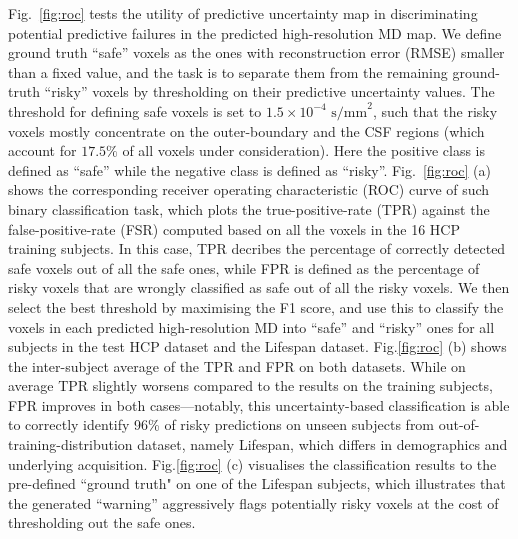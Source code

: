 Fig.~\ref{fig:roc} tests the utility of predictive uncertainty map in discriminating potential predictive failures in the predicted high-resolution MD map. We define ground truth ``safe'' voxels as the ones with reconstruction error (RMSE) smaller than a fixed value, and the task is to separate them from the remaining ground-truth ``risky'' voxels  by thresholding on their predictive uncertainty values. The threshold for defining safe voxels is set to $1.5\times10^{-4} \text{ s/mm}^2$, such that the risky voxels mostly concentrate on the outer-boundary and the CSF regions (which account for $17.5\%$ of all voxels under consideration). Here the positive class is defined as ``safe'' while  the negative class is defined as ``risky''. Fig.~\ref{fig:roc} (a) shows the corresponding receiver operating characteristic (ROC) curve of such binary classification task, which plots the true-positive-rate (TPR) against the false-positive-rate (FSR) computed based on all the voxels in the 16 HCP training subjects. In this case, TPR decribes the percentage of correctly detected safe voxels out of all the safe ones, while FPR is defined as the percentage of risky voxels that are wrongly classified as safe out of all the risky voxels. We then select the best threshold by maximising the F1 score, and use this to classify the voxels in each predicted high-resolution MD into ``safe'' and ``risky'' ones for all subjects in the test HCP dataset and the Lifespan dataset. Fig.\ref{fig:roc} (b) shows the inter-subject average of the TPR and FPR on both datasets. While on average TPR slightly worsens compared to the results on the training subjects, FPR improves in both cases---notably, this uncertainty-based classification is able to correctly identify 96\% of risky predictions on unseen subjects from out-of-training-distribution dataset, namely Lifespan, which differs in demographics and underlying acquisition. Fig.\ref{fig:roc} (c) visualises the classification results to the pre-defined ``ground truth" on one of the Lifespan subjects, which illustrates that the generated ``warning'' aggressively flags potentially risky voxels at the cost of thresholding out the safe ones. 

